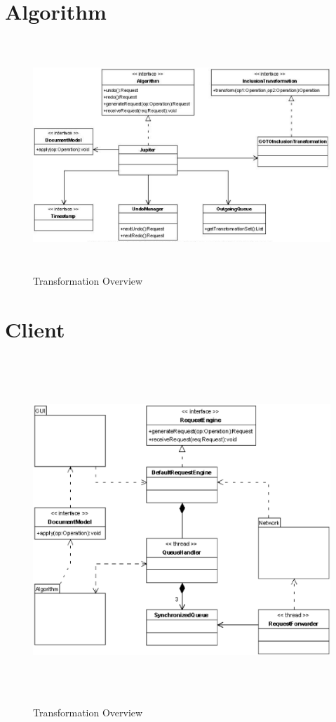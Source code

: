 \section{Algorithm}
\begin{figure}[H]
\centering
\includegraphics[height=8.74cm,width=14.95cm]{../../images/algo-impl/algorithm_diagram.eps}
\caption{Transformation Overview}
\label{Transformation Overview}
\end{figure}

\section{Client}
\begin{figure}[H]
\centering
\includegraphics[height=13.04cm,width=15.46cm]{../../images/algo-impl/client_diagram.eps}
\caption{Transformation Overview}
\label{Transformation Overview}
\end{figure}


